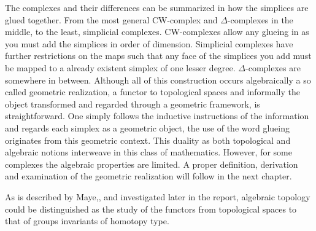 \documentclass[../../main.tex]{subfiles}
\begin{document}
    The complexes and their differences can be summarized in how the simplices are glued together. From the most general CW-complex and $\Delta$-complexes in the middle, to the least, simplicial complexes. CW-complexes allow any glueing in as you must add the simplices in order of dimension. Simplicial complexes have further restrictions on the maps such that any face of the simplices you add must be mapped to a already existent simplex of one lesser degree. $\Delta$-complexes are somewhere in between. Although all of this construction occurs algebraically a so called geometric realization, a functor to topological spaces and informally the object transformed and regarded through a geometric framework, is straightforward. One simply follows the inductive instructions of the information and regards each simplex as a geometric object, the use of the word glueing originates from this geometric context. This duality as both topological and algebraic notions interweave in this class of mathematics. However, for some complexes the algebraic properties are limited. A proper definition, derivation and examination of the geometric realization will follow in the next chapter.

    As is described by Maye,\cite{simp-maye}, and investigated later in the report, algebraic topology could be distinguished as the study of the functors from topological spaces to that of groups invariants of homotopy type. 

    
\end{document}
